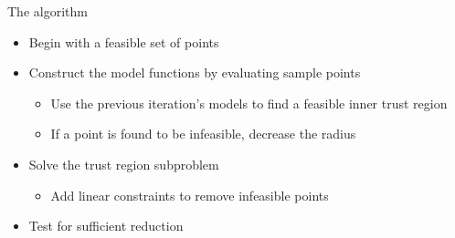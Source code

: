 \documentclass{beamer}
\begin{document}
\begin{frame}{The algorithm}
    \begin{itemize}
        \item Begin with a feasible set of points
        \item Construct the model functions by evaluating sample points
            \begin{itemize}
                \item Use the previous iteration's models to find a feasible inner trust region
                \item If a point is found to be infeasible, decrease the radius
            \end{itemize}
        \item Solve the trust region subproblem
            \begin{itemize}
                \item Add linear constraints to remove infeasible points
            \end{itemize}
        \item Test for sufficient reduction
    \end{itemize}
\end{frame}

\end{document}

